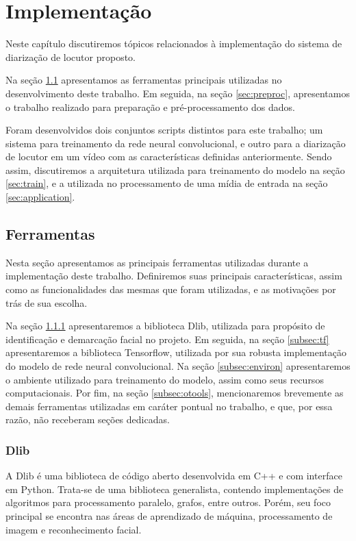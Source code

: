 \chapter{Implementação}
\label{chap:impl}

Neste capítulo discutiremos tópicos relacionados à implementação do sistema de diarização de locutor proposto. 

Na seção \ref{sec:tools} apresentamos as ferramentas principais utilizadas no desenvolvimento deste trabalho.
Em seguida, na seção \ref{sec:preproc}, apresentamos o trabalho realizado para preparação e pré-processamento dos dados.

Foram desenvolvidos dois conjuntos scripts distintos para este trabalho; um sistema para treinamento da rede neural convolucional, e outro para a diarização de locutor em um vídeo com as características definidas anteriormente.
Sendo assim, discutiremos a arquitetura utilizada para treinamento do modelo na seção \ref{sec:train}, e a utilizada no processamento de uma mídia de entrada na seção \ref{sec:application}.

\section{Ferramentas}
\label{sec:tools}

Nesta seção apresentamos as principais ferramentas utilizadas durante a implementação deste trabalho.
Definiremos suas principais características, assim como as funcionalidades das mesmas que foram utilizadas, e as motivações por trás de sua escolha.

Na seção \ref{subsec:dlib} apresentaremos a biblioteca Dlib, utilizada para propósito de identificação e demarcação facial no projeto.
Em seguida, na seção \ref{subsec:tf} apresentaremos a biblioteca Tensorflow, utilizada por sua robusta implementação do modelo de rede neural convolucional.
Na seção \ref{subsec:environ} apresentaremos o ambiente utilizado para treinamento do modelo, assim como seus recursos computacionais.
Por fim, na seção \ref{subsec:otools}, mencionaremos brevemente as demais ferramentas utilizadas em caráter pontual no trabalho, e que, por essa razão, não receberam seções dedicadas.

\subsection{Dlib}
\label{subsec:dlib}
A Dlib\cite{dlib09} é uma biblioteca de código aberto desenvolvida em C++ e com interface em Python.
Trata-se de uma biblioteca generalista, contendo implementações de algoritmos para processamento paralelo, grafos, entre outros.
Porém, seu foco principal se encontra nas áreas de aprendizado de máquina, processamento de imagem e reconhecimento facial.

